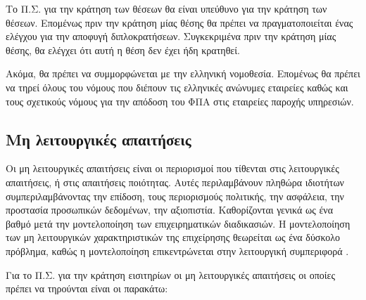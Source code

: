 \documentclass{assignment}
\begin{document}
Το Π.Σ. για την κράτηση των θέσεων θα είναι υπεύθυνο για την κράτηση των θέσεων. Επομένως πριν την κράτηση μίας θέσης θα πρέπει να πραγματοποιείται ένας ελέγχου για την αποφυγή διπλοκρατήσεων. Συγκεκριμένα πριν την κράτηση μίας θέσης, θα ελέγχει ότι αυτή η θέση δεν έχει ήδη κρατηθεί.

Ακόμα, θα πρέπει να συμμορφώνεται με την ελληνική νομοθεσία. Επομένως θα πρέπει να τηρεί όλους του νόμους που διέπουν τις ελληνικές ανώνυμες εταιρείες καθώς και τους σχετικούς νόμους για την απόδοση του ΦΠΑ στις εταιρείες παροχής υπηρεσιών.

\subsection{Μη λειτουργικές απαιτήσεις}

Οι μη λειτουργικές απαιτήσεις είναι οι περιορισμοί που τίθενται στις λειτουργικές απαιτήσεις, ή στις απαιτήσεις ποιότητας. Αυτές περιλαμβάνουν πληθώρα ιδιοτήτων συμπεριλαμβάνοντας την επίδοση, τους περιορισμούς πολιτικής, την ασφάλεια, την προστασία προσωπικών δεδομένων, την αξιοπιστία. Καθορίζονται γενικά ως ένα βαθμό μετά την μοντελοποίηση των επιχειρηματικών διαδικασιών. Η μοντελοποίηση των μη λειτουργικών χαρακτηριστικών της επιχείρησης θεωρείται ως ένα δύσκολο πρόβλημα, καθώς η μοντελοποίηση επικεντρώνεται στην λειτουργική συμπεριφορά \cite{triadis}.

Για το Π.Σ. για την κράτηση εισιτηρίων οι μη λειτουργικές απαιτήσεις οι οποίες πρέπει να τηρούνται είναι οι παρακάτω:
\end{document}
